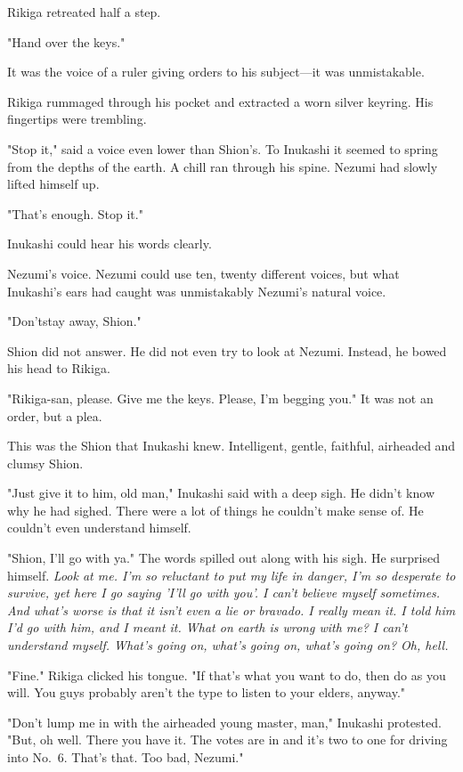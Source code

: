 Rikiga retreated half a step.

"Hand over the keys."

It was the voice of a ruler giving orders to his subject---it was
unmistakable.

Rikiga rummaged through his pocket and extracted a worn silver keyring.
His fingertips were trembling.

"\el Stop it," said a voice even lower than Shion's. To Inukashi it
seemed to spring from the depths of the earth. A chill ran through his
spine. Nezumi had slowly lifted himself up.

"That's enough. Stop it."

Inukashi could hear his words clearly.

Nezumi's voice. Nezumi could use ten, twenty different voices, but what
Inukashi's ears had caught was unmistakably Nezumi's natural voice.

"Don't\el stay away, Shion."

Shion did not answer. He did not even try to look at Nezumi. Instead, he
bowed his head to Rikiga.

"Rikiga-san, please. Give me the keys. Please, I'm begging you." It was
not an order, but a plea.

This was the Shion that Inukashi knew. Intelligent, gentle, faithful,
airheaded and clumsy Shion.

"Just give it to him, old man," Inukashi said with a deep sigh. He
didn't know why he had sighed. There were a lot of things he couldn't
make sense of. He couldn't even understand himself.

"Shion, I'll go with ya." The words spilled out along with his sigh. He
surprised himself. \emph{Look at me. I'm so reluctant to put my life in
danger, I'm so desperate to survive, yet here I go saying 'I'll go with
you'. I can't believe myself sometimes. And what's worse is that it
isn't even a lie or bravado. I really mean it. I told him I'd go with
him, and I meant it. What on earth is wrong with me? I can't understand
myself. What's going on, what's going on, what's going on? Oh, hell.}

"Fine." Rikiga clicked his tongue. "If that's what you want to do, then
do as you will. You guys probably aren't the type to listen to your
elders, anyway."

"Don't lump me in with the airheaded young master, man," Inukashi
protested. "But, oh well. There you have it. The votes are in and it's
two to one for driving into No.~6. That's that. Too bad, Nezumi."

